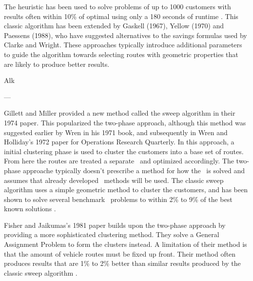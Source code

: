 The heuristic has been used to solve problems of up to 1000 customers with results often within 10\% of optimal using only a 180 seconds of runtime \cite{TV2001}. This classic algorithm has been extended by Gaskell (1967), Yellow (1970) and Paessens (1988), who have suggested alternatives to the savings formulas used by Clarke and Wright. These approaches typically introduce additional parameters to guide the algorithm towards selecting routes with geometric properties that are likely to produce better results.  

Alk

---


Gillett and Miller provided a new method called the sweep algorithm in their 1974 paper. This popularized the two-phase approach, although this method was suggested earlier by Wren in his 1971 book, and subsequently in Wren and Holliday's 1972 paper for Operations Research Quarterly. In this approach, a initial clustering phase is used to cluster the customers into a  base set of routes. From here the routes are treated a separate \TSP\ and optimized accordingly. The two-phase approache typically doesn't prescribe a method for how the \TSP\ is solved and assumes that already developed \TSP\ methods will be used. The classic sweep algorithm uses a simple geometric method to cluster the customers, and has been shown to solve several benchmark \VRP\ problems to within 2\% to 9\% of the best known solutions \cite{TV2001}.

Fisher and Jaikumas's 1981 paper builds upon the two-phase approach by providing a more sophisticated clustering method. They solve a General Assignment Problem to form the clusters instead. A limitation of their method is that the amount of vehicle routes must be fixed up front. Their method often produces results that are 1\% to 2\% better than similar results produced by the classic sweep algorithm \cite{TV2001}.


